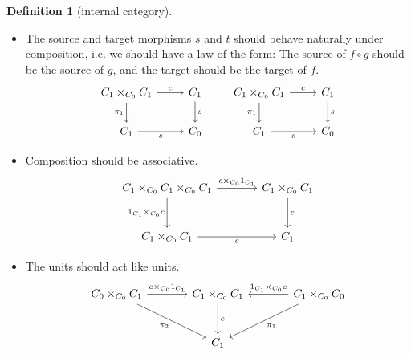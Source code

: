 \documentclass[a4paper]{report}
\theoremstyle{definition}
\newtheorem{definition}{Definition}[section]
\theoremstyle{plain}
\theoremstyle{remark}
\begin{document}
\begin{definition}[internal category]
\begin{itemize}
    \item The source and target morphisms $s$ and $t$ should behave naturally under composition, i.e. we should have a law of the form: The source of $f \circ g$ should be the source of $g$, and the target should be the target of $f$.
      \begin{equation*}
        \begin{tikzcd}
          C_{1} \times_{C_{0}} C_{1} 
          \arrow[r, "c"]
          \arrow[d, swap, "\pi_{1}"]
          & C_{1}
          \arrow[d, "s"]
          \\
          C_{1}
          \arrow[r, swap, "s"]
          & C_{0}
        \end{tikzcd}
        \qquad
        \begin{tikzcd}
          C_{1} \times_{C_{0}} C_{1} 
          \arrow[r, "c"]
          \arrow[d, swap, "\pi_{1}"]
          & C_{1}
          \arrow[d, "s"]
          \\
          C_{1}
          \arrow[r, swap, "s"]
          & C_{0}
        \end{tikzcd}
      \end{equation*}

    \item Composition should be associative.
      \begin{equation*}
        \begin{tikzcd}[column sep=large, row sep=large]
          C_{1} \times_{C_{0}} C_{1} \times_{C_{0}} C_{1}
          \arrow[r, "c \times_{C_{0}} 1_{C_{1}}"]
          \arrow[d, swap, "1_{C_{1}} \times_{C_{0}} c"]
          & C_{1} \times_{C_{0}} C_{1}
          \arrow[d, "c"]
          \\
          C_{1} \times_{C_{0}} C_{1}
          \arrow[r, swap, "c"]
          & C_{1}
        \end{tikzcd}
      \end{equation*}

    \item The units should act like units.
      \begin{equation*}
        \begin{tikzcd}[column sep=large, row sep=large]
          C_{0} \times_{C_{0}} C_{1}
          \arrow[r, "e \times_{C_{0}} 1_{C_{1}}"]
          \arrow[dr, swap, "\pi_{2}"]
          & C_{1} \times_{C_{0}} C_{1}
          \arrow[d, "c"]
          & C_{1} \times_{C_{0}} C_{0}
          \arrow[l, swap, "1_{C_{1}} \times_{C_{0}} e"]
          \arrow[dl, "\pi_{1}"]
          \\
          & C_{1}
        \end{tikzcd}
      \end{equation*}
  \end{itemize}


\end{definition}
\end{document}
